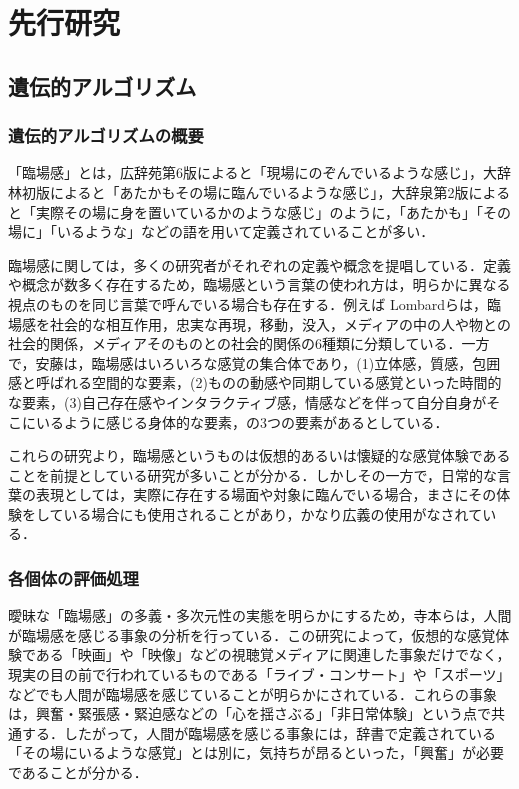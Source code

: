 \chapter{先行研究}
\thispagestyle{fancy} %
\lhead{}
\chead{}
\rhead{}
\lfoot{} 
\cfoot{\thepage}  
\rfoot{}
%

\section{遺伝的アルゴリズム}
\label{sec2.1}

\subsection{遺伝的アルゴリズムの概要}
\label{sec2.1.1}

「臨場感」とは，広辞苑第6版によると「現場にのぞんでいるような感じ」，大辞林初版によると「あたかもその場に臨んでいるような感じ」，大辞泉第2版によると「実際その場に身を置いているかのような感じ」のように，「あたかも」「その場に」「いるような」などの語を用いて定義されていることが多い\cite{rinjyo1}．

臨場感に関しては，多くの研究者がそれぞれの定義や概念を提唱している．定義や概念が数多く存在するため，臨場感という言葉の使われ方は，明らかに異なる視点のものを同じ言葉で呼んでいる場合も存在する．例えば Lombardらは，臨場感を社会的な相互作用，忠実な再現，移動，没入，メディアの中の人や物との社会的関係，メディアそのものとの社会的関係の6種類に分類している\cite{lombard}．一方で，安藤は，臨場感はいろいろな感覚の集合体であり，(1)立体感，質感，包囲感と呼ばれる空間的な要素，(2)ものの動感や同期している感覚といった時間的な要素，(3)自己存在感やインタラクティブ感，情感などを伴って自分自身がそこにいるように感じる身体的な要素，の3つの要素があるとしている\cite{ando}．

これらの研究より，臨場感というものは仮想的あるいは懐疑的な感覚体験であることを前提としている研究が多いことが分かる．しかしその一方で，日常的な言葉の表現としては，実際に存在する場面や対象に臨んでいる場合，まさにその体験をしている場合にも使用されることがあり，かなり広義の使用がなされている．




\subsection{各個体の評価処理}
\label{sec2.1.2}
  
曖昧な「臨場感」の多義・多次元性の実態を明らかにするため，寺本らは，人間が臨場感を感じる事象の分析を行っている\cite{rinjyo2}．この研究によって，仮想的な感覚体験である「映画」や「映像」などの視聴覚メディアに関連した事象だけでなく，現実の目の前で行われているものである「ライブ・コンサート」や「スポーツ」などでも人間が臨場感を感じていることが明らかにされている．これらの事象は，興奮・緊張感・緊迫感などの「心を揺さぶる」「非日常体験」という点で共通する．したがって，人間が臨場感を感じる事象には，辞書で定義されている「その場にいるような感覚」とは別に，気持ちが昂るといった，「興奮」が必要であることが分かる．

